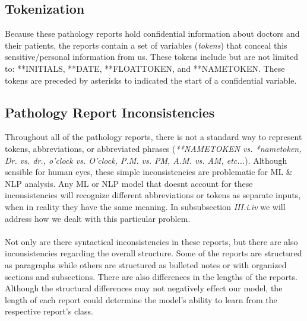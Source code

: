 \documentclass[twoside,twocolumn]{article}
\begin{document}
\begin{table}
\caption{Labeled Pathology Report Contributions}
\centering
{}
\end{table}

\subsection{Tokenization}
Because these pathology reports hold confidential information about doctors and their patients, the reports contain a set of variables (\textit{tokens}) that conceal this sensitive/personal information from us. These tokens include but are not limited to: **INITIALS, **DATE, **FLOATTOKEN, and **NAMETOKEN. These tokens are preceded by asterisks to indicated the start of a confidential variable. 

\subsection{Pathology Report Inconsistencies}
Throughout all of the pathology reports, there is not a standard way to represent tokens, abbreviations, or abbreviated phrases (\textit{**NAMETOKEN vs. *nametoken, Dr. vs. dr., o'clock vs. O'clock, P.M. vs. PM, A.M. vs. AM, etc...}). Although sensible for human eyes, these simple inconsistencies are problematic for ML \& NLP analysis. Any ML or NLP model that doesn\textquotesingle t account for these inconsistencies will recognize different abbreviations or tokens as separate inputs, when in reality they have the same meaning. In subsubsection \textit{III.i.iv} we will address how we dealt with this particular problem.\\
\\
Not only are there syntactical inconsistencies in these reports, but there are also inconsistencies regarding the overall structure. Some of the reports are structured as paragraphs while others are structured as bulleted notes or with organized sections and subsections. There are also differences in the lengths of the reports. Although the structural differences may not negatively effect our model, the length of each report could determine the model's ability to learn from the respective report's class.
\end{document}
